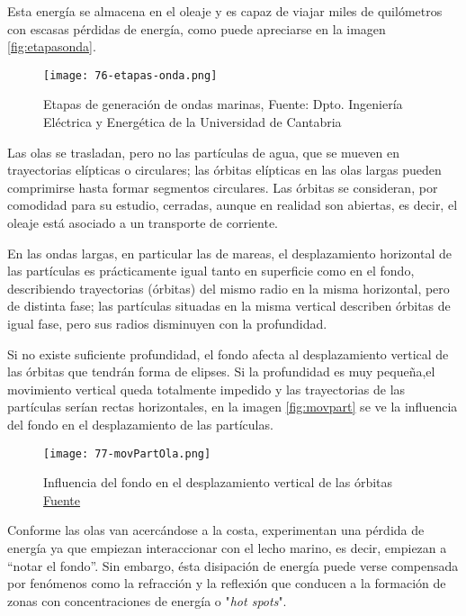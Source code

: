 Esta energía se almacena en el oleaje y es capaz de viajar miles de
quilómetros con escasas pérdidas de energía, como puede apreciarse en la imagen \autoref{fig:etapasonda}.

\begin{figure}
\centering
\texttt{[image: 76-etapas-onda.png]}
\caption[Etapas de generación de ondas marinas]{Etapas de generación de ondas marinas, Fuente: Dpto. Ingeniería
Eléctrica y Energética de la Universidad de Cantabria}
\label{fig:etapasonda}
\end{figure}



Las olas se trasladan, pero no las partículas de agua, que se mueven en
trayectorias elípticas o circulares; las órbitas elípticas en las olas
largas pueden comprimirse hasta formar segmentos circulares. Las órbitas
se consideran, por comodidad para su estudio, cerradas, aunque en
realidad son abiertas, es decir, el oleaje está asociado a un transporte
de corriente.

En las ondas largas, en particular las de mareas, el desplazamiento
horizontal de las partículas es prácticamente igual tanto en superficie
como en el fondo, describiendo trayectorias (órbitas) del mismo radio en
la misma horizontal, pero de distinta fase; las partículas situadas en
la misma vertical describen órbitas de igual fase, pero sus radios
disminuyen con la profundidad.

Si no existe suficiente profundidad, el fondo afecta al desplazamiento
vertical de las órbitas que tendrán forma de elipses. Si la profundidad
es muy pequeña,el movimiento vertical queda totalmente impedido y las
trayectorias de las partículas serían rectas horizontales, en la imagen \autoref{fig:movpart} se ve la influencia del fondo en el desplazamiento de las partículas.

\begin{figure}
\centering
\texttt{[image: 77-movPartOla.png]}
\caption[Influencia del fondo en el desplazamiento de las órbitas]{Influencia del fondo en el desplazamiento vertical de las órbitas \href{http://files.pfernandezdiez.es/EnergiasAlternativas/mar/PDFs/01Olas.pdf}{Fuente}}
\label{fig:movpart}
\end{figure}



Conforme las olas van acercándose a la costa, experimentan una pérdida
de energía ya que empiezan interaccionar con el lecho marino, es decir,
empiezan a ``notar el fondo''. Sin embargo, ésta disipación de energía
puede verse compensada por fenómenos como la refracción y la reflexión
que conducen a la formación de zonas con concentraciones de energía o
"\emph{hot spots}".

